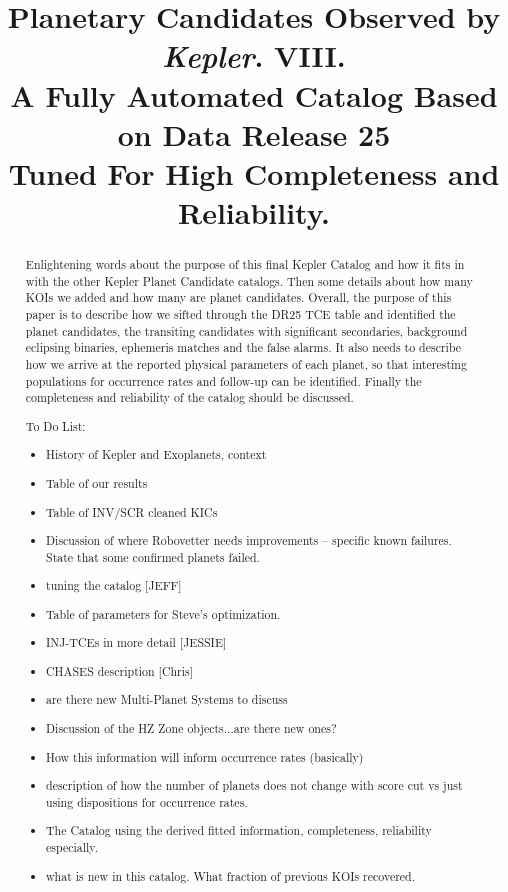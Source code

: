 \documentclass[apj,twocolappendix,numberedappendix]{emulateapj}
\renewcommand{\_}{\discretionary{\underscore}{}{\underscore}}  %
\newcommand\Kepler{\textit{Kepler}}
\begin{document}

\title{Planetary Candidates Observed by \Kepler. VIII.\\
A Fully Automated Catalog Based on Data Release 25\\Tuned For High Completeness and Reliability. }



\begin{abstract}
Enlightening words about the purpose of this final Kepler Catalog and how it fits in with the other Kepler Planet Candidate catalogs. Then some details about how many KOIs we added and how many are planet candidates. 
Overall, the purpose of this paper is to describe how we sifted through the DR25 TCE table and identified the planet candidates, the transiting candidates with significant secondaries, background eclipsing binaries, ephemeris matches and the false alarms. It also needs to describe how we arrive at the reported physical parameters of each planet, so that interesting populations for occurrence rates and follow-up can be identified.  Finally the completeness and reliability of the catalog should be discussed.

To Do List:
\begin{itemize}
\item History of Kepler and Exoplanets, context
\item Table of our results
\item Table of INV/SCR cleaned KICs
\item Discussion of where Robovetter needs improvements -- specific known failures. State that some confirmed planets failed.
\item tuning the catalog [JEFF]
\item Table of parameters for Steve's optimization.
\item INJ-TCEs in more detail [JESSIE]
\item CHASES description [Chris]
\item are there new Multi-Planet Systems to discuss
\item Discussion of the HZ Zone objects...are there new ones?
\item How this information will inform occurrence rates (basically)
\item description of how the number of planets does not change with score cut vs just using dispositions for occurrence rates.
\item The Catalog using the derived fitted information, completeness, reliability especially.
\item what is new in this catalog. What fraction of previous KOIs recovered.


\end{itemize}
\end{abstract}
\end{document}
